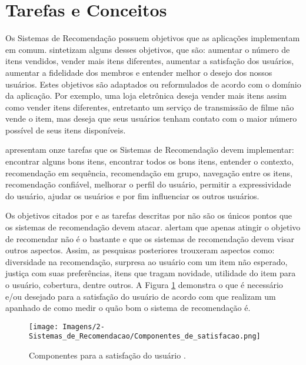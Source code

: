 \section{Tarefas e Conceitos}
Os Sistemas de Recomendação possuem objetivos que as aplicações implementam em comum.  sintetizam alguns desses objetivos, que são: aumentar o número de itens vendidos, vender mais itens diferentes, aumentar a satisfação dos usuários, aumentar a fidelidade dos membros e entender melhor o desejo dos nossos usuários. Estes objetivos são adaptados ou reformulados de acordo com o domínio da aplicação. Por exemplo, uma loja eletrônica deseja vender mais itens assim como vender itens diferentes, entretanto um serviço de transmissão de filme não vende o item, mas deseja que seus usuários tenham contato com o maior número possível de seus itens disponíveis.

 apresentam onze tarefas que os Sistemas de Recomendação devem implementar: encontrar alguns bons itens, encontrar todos os bons itens, entender o contexto, recomendação em sequência, recomendação em grupo, navegação entre os itens, recomendação confiável, melhorar o perfil do usuário, permitir a expressividade do usuário, ajudar os usuários e por fim influenciar os outros usuários.

Os objetivos citados por  e as tarefas descritas por  não são os únicos pontos que os sistemas de recomendação devem atacar.  alertam que apenas atingir o objetivo de recomendar não é o bastante e que os sistemas de recomendação devem visar outros aspectos. Assim, as pesquisas posteriores trouxeram aspectos como: diversidade na recomendação, surpresa ao usuário com um item não esperado, justiça com suas preferências, itens que tragam novidade, utilidade do item para o usuário, cobertura, dentre outros. A Figura \ref{fig:user_satiscation_component} demonstra o que é necessário e/ou desejado para a satisfação do usuário de acordo com  que realizam um apanhado de como medir o quão bom o sistema de recomendação é.

\begin{figure}[hbt!]
    \centering
    \texttt{[image: Imagens/2-Sistemas\_de\_Recomendacao/Componentes\_de\_satisfacao.png]}
    \caption{Componentes para a satisfação do usuário \cite{Silveira:2017}.}
    \label{fig:user_satiscation_component}
\end{figure}

